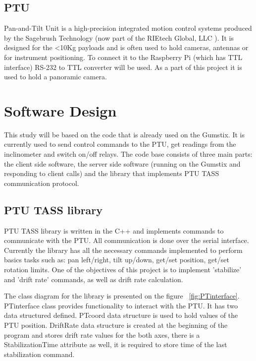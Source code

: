 \subsection{PTU}
Pan-and-Tilt Unit is a high-precision integrated motion control systems produced by the Sagebrush Technology (now part of the RIEtech Global, LLC \cite{RIEtech_Global}). It is designed for the <10Kg payloads and is often used to hold cameras, antennas or for instrument positioning. To connect it to the Raspberry Pi (which has TTL interface) RS-232 to TTL converter will be used. As a part of this project it is used to hold a panoramic camera. 

\section{Software Design}
This study will be based on the code that is already used on the Gumstix. It is currently used to send control commands to the PTU, get readings from the inclinometer and switch on/off relays. The code base consists of three main parts: the client side software, the server side software (running on the Gumstix and responding to client calls) and the library that implements PTU TASS communication protocol. 

\subsection{PTU TASS library}
PTU TASS library is written in the C++ and implements commands to communicate with the PTU. All communication is done over the serial interface. Currently the library has all the necessary commands implemented to perform basics tasks such as: pan left/right, tilt up/down, get/set position, get/set rotation limits. One of the objectives of this project is to implement 'stabilize' and 'drift rate' commands, as well as drift rate calculation. 

The class diagram for the library is presented on the figure ~\ref{fig:PTinterface}. PTinterface class provides functionality to interact with the PTU. It has two data structured defined. PTcoord data structure is used to hold values of the PTU position. DriftRate data structure is created at the beginning of the program and stores drift rate values for the both axes, there is a StabilizationTime attribute as well, it is required to store time of the last stabilization command.    

